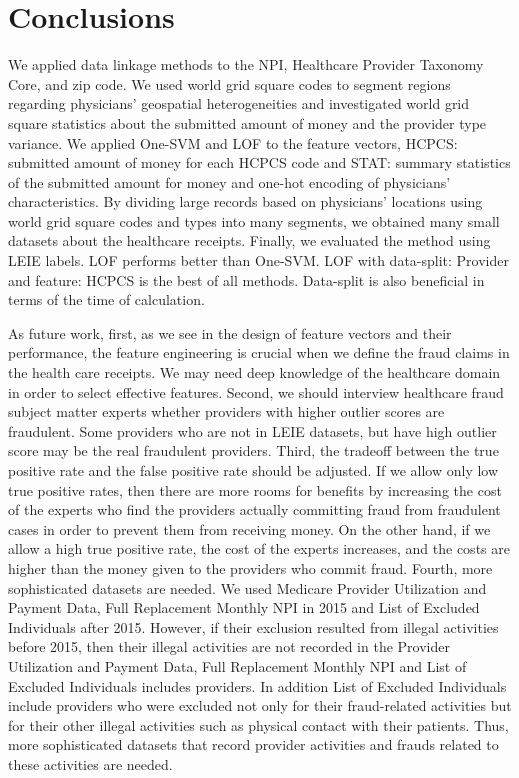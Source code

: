 \documentclass[dvipdfmx, english]{ampmt}             %
\begin{document}
\section{Conclusions}\label{sec:conclusions}
We applied data linkage methods to the NPI, Healthcare Provider Taxonomy Core, and zip code. We used world grid square codes to segment regions regarding physicians' geospatial heterogeneities and investigated world grid square statistics about the submitted amount of money and the provider type variance. We applied One-SVM and LOF to the feature vectors, HCPCS: submitted amount of money for each HCPCS code and STAT: summary statistics of the submitted amount for money and one-hot encoding of physicians'  characteristics. By dividing large records based on physicians' locations using world grid square codes and types into many segments, we obtained many small datasets about the healthcare receipts. Finally, we evaluated the method using LEIE labels. 
LOF performs better than One-SVM. LOF with data-split: Provider and feature: HCPCS is the best of all methods. Data-split is also beneficial in terms of the time of calculation.
\par
As future work, first, as we see in the design of feature vectors and their performance, the feature engineering is crucial when we define the fraud claims in the health care receipts. We may need deep knowledge of the healthcare domain in order to select effective features.
Second, we should interview healthcare fraud subject matter experts whether providers with higher outlier scores are fraudulent. Some providers who are not in LEIE datasets, but have high outlier score may be the real fraudulent providers.
Third, the tradeoff between the true positive rate and the false positive rate should be adjusted. If we allow only low true positive rates, then  there are more rooms for benefits by increasing the cost of the experts who find the providers actually committing fraud from fraudulent cases in order to prevent them from receiving money. On the other hand, if we allow a high true positive rate, the cost of the experts increases, and the costs are higher than the money given to the providers who commit fraud. 
Fourth, more sophisticated datasets are needed. We used Medicare Provider Utilization and Payment Data, Full Replacement Monthly NPI in 2015 and List of Excluded Individuals after 2015. However, if their exclusion resulted from illegal activities before 2015, then their illegal activities are not recorded in the Provider Utilization and Payment Data, Full Replacement Monthly NPI and List of Excluded Individuals includes providers. In addition List of Excluded Individuals include providers who were excluded not only for their fraud-related activities but for their other illegal activities such as physical contact with their patients. Thus, more sophisticated datasets that record provider activities and frauds related to these activities are needed.
\end{document}
